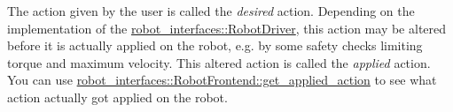 The action given by the user is called the {\itshape desired} action. Depending on the implementation of the \hyperlink{classrobot__interfaces_1_1RobotDriver}{robot\+\_\+interfaces\+::\+Robot\+Driver}, this action may be altered before it is actually applied on the robot, e.\+g. by some safety checks limiting torque and maximum velocity. This altered action is called the {\itshape applied} action. You can use \hyperlink{classrobot__interfaces_1_1RobotFrontend_a870651d849fe0f1a4909820cc3b6de40}{robot\+\_\+interfaces\+::\+Robot\+Frontend\+::get\+\_\+applied\+\_\+action} to see what action actually got applied on the robot. 